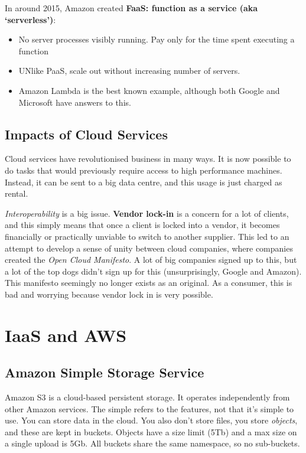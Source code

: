 \documentclass[11pt,a4paper,titlepage,dvipsnames,cmyk]{scrartcl}
\begin{document}
In around 2015, Amazon created \textbf{FaaS: function as a service (aka `serverless')}:
\begin{itemize}
    \item No server processes visibly running. Pay only for the time spent executing a function
    \item UNlike PaaS, scale out without increasing number of servers.
    \item Amazon Lambda is the best known example, although both Google and Microsoft have answers to this.
\end{itemize}

\subsection{Impacts of Cloud Services}
Cloud services have revolutionised business in many ways. It is now possible to do tasks that would previously require access to high performance machines. Instead, it can be sent to a big data centre, and this usage is just charged as rental.

\textit{Interoperability} is a big issue. \textbf{Vendor lock-in} is a concern for a lot of clients, and this simply means that once a client is locked into a vendor, it becomes financially or practically unviable to switch to another supplier. This led to an attempt to develop a sense of unity between cloud companies, where companies created the \textit{Open Cloud Manifesto}. A lot of big companies signed up to this, but a lot of the top dogs didn't sign up for this (unsurprisingly, Google and Amazon). This manifesto seemingly no longer exists as an original. As a consumer, this is bad and worrying because vendor lock in is very possible.

\section{IaaS and AWS}
\subsection{Amazon Simple Storage Service}
Amazon S3 is a cloud-based persistent storage. It operates independently from other Amazon services. The simple refers to the features, not that it's simple to use. You can store data in the cloud. You also don't store files, you store \textit{objects}, and these are kept in buckets. Objects have a size limit (5Tb) and a max size on a single upload is 5Gb. All buckets share the same namespace, so no sub-buckets.
\end{document}
